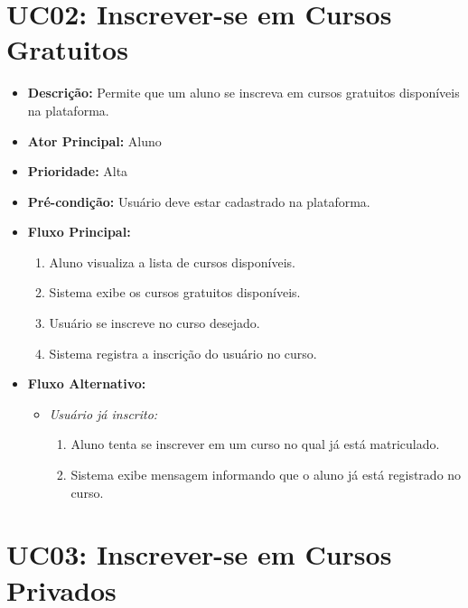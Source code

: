         \section*{UC02: Inscrever-se em Cursos Gratuitos}

        \begin{itemize}
            \item \textbf{Descrição:} Permite que um aluno se inscreva em cursos gratuitos disponíveis na plataforma.
            
            \item \textbf{Ator Principal:} Aluno
            
            \item \textbf{Prioridade:} Alta
            
            \item \textbf{Pré-condição:} Usuário deve estar cadastrado na plataforma.
            
            \item \textbf{Fluxo Principal:}
            \begin{enumerate}
                \item Aluno visualiza a lista de cursos disponíveis.
                \item Sistema exibe os cursos gratuitos disponíveis.
                \item Usuário se inscreve no curso desejado.
                \item Sistema registra a inscrição do usuário no curso.
            \end{enumerate}

            \item \textbf{Fluxo Alternativo:}
            \begin{itemize}
                \item \textit{Usuário já inscrito:}
                \begin{enumerate}
                    \item Aluno tenta se inscrever em um curso no qual já está matriculado.
                    \item Sistema exibe mensagem informando que o aluno já está registrado no curso.
                \end{enumerate}
            \end{itemize}
        \end{itemize}

        \section*{UC03: Inscrever-se em Cursos Privados}

